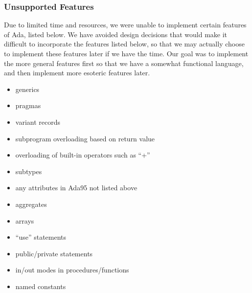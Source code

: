 \documentclass[onecolumn,11pt]{article}
\begin{document}
\subsubsection{Unsupported Features}
Due to limited time and resources, we were unable to implement certain features of Ada, listed below. We have avoided design decisions that would make it difficult to incorporate the features listed below, so that we may actually choose to implement these features later if we have the time. Our goal was to implement the more general features first so that we have a somewhat functional language, and then implement more esoteric features later.
\begin{itemize}
  \item{generics}
  \item{pragmas}
  \item{variant records}
  \item{subprogram overloading based on return value}
  \item{overloading of built-in operators such as ``+''}
  \item{subtypes}
  \item{any attributes in Ada95 not listed above}
  \item{aggregates}
  \item{arrays}
  \item{``use'' statements}
  \item{public/private statements}
  \item{in/out modes in procedures/functions}
  \item{named constants}
\end{itemize}
\end{document}
